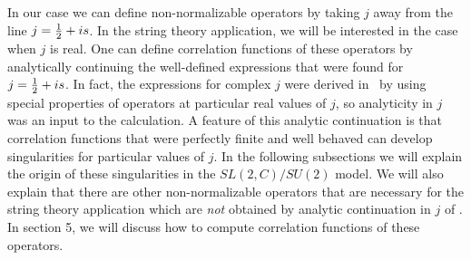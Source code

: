 In our case we can
define non-normalizable operators by taking $j$ away from the line
$j= {1 \over 2} + is$. In the string theory application, we will
be interested in the case when $j$ is real.
One can  define correlation functions of these
operators  by analytically continuing  the
well-defined expressions that were found for  $j= {1 \over 2} + is$.
In fact, the expressions for complex $j$ were derived in
\teschnerone\  by using
special properties of operators at particular real  values of  $j$,
so analyticity in $j$ was an input to the calculation.
A feature of this analytic continuation is that correlation functions
that were perfectly finite and well behaved can develop singularities
for particular values of $j$. In the following subsections we will
explain the origin of these singularities in the $SL(2,C)/SU(2)$ model.
We will also explain that there are other non-normalizable operators that
are necessary for the string theory application which are {\it not}
obtained by analytic continuation in $j$ of \operators .
In section 5, we will discuss how to compute correlation functions
of these operators.



